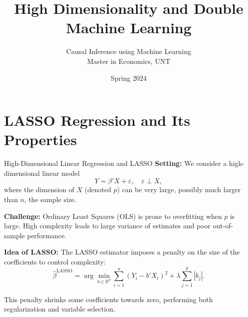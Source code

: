 \documentclass[xcolor=svgnames,t]{beamer}
\title[High Dimensionality and DML]{High Dimensionality and Double Machine Learning}
\subtitle{}
\author[CIML ]{Causal Inference using Machine Learning\\ Master in Economics, UNT}
\institute[]{Andres Mena}
\date{Spring 2024}
\begin{document}
\begin{frame}
\maketitle
\end{frame}

\section{LASSO Regression and Its Properties}

\begin{frame}{High-Dimensional Linear Regression and LASSO }
\textbf{Setting:} We consider a high-dimensional linear model
\[
Y = \beta'X + \varepsilon, \quad \varepsilon \perp X,
\]
where the dimension of $X$ (denoted $p$) can be very large, possibly much larger than $n$, the sample size.

\pause

\textbf{Challenge:} Ordinary Least Squares (OLS) is prone to overfitting when $p$ is large. High complexity leads to large variance of estimates and poor out-of-sample performance.

\pause

\textbf{Idea of LASSO:} The LASSO estimator imposes a penalty on the size of the coefficients to control complexity:
\[
\widehat{\beta}^{\text{LASSO}} = \arg\min_{b \in \mathbb{R}^p} \sum_{i=1}^n (Y_i - b'X_i)^2 + \lambda \sum_{j=1}^p |b_j|.
\]

\pause

This penalty shrinks some coefficients towards zero, performing both regularization and variable selection.
\end{frame}
\end{document}
